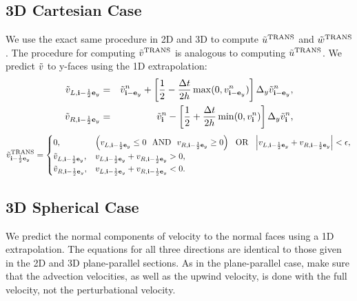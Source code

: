 \newpage

\subsection{3D Cartesian Case}
We use the exact same procedure in 2D and 3D to compute $\tilde{u}^{\rm TRANS}$ and 
$\tilde{w}^{\rm TRANS}$. The procedure for computing $\tilde{v}^{\rm TRANS}$ is analogous to
computing $\tilde{u}^{\rm TRANS}$.  We predict $\tilde{v}$ to y-faces using the
1D extrapolation:
\begin{eqnarray}
\tilde{v}_{L,{\bf i}-\frac{1}{2}{\bf e}_y} &=& \tilde{v}_{{\bf i}-{\bf e}_y}^n + \left[\frac{1}{2} - \frac{\Delta t}{2h}\max(0,v_{{\bf i}-{\bf e}_y}^n)\right]\Delta_y \tilde{v}_{{\bf i}-{\bf e}_y}^n, \\
\tilde{v}_{R,{\bf i}-\frac{1}{2}{\bf e}_y} &=& \tilde{v}_{{\bf i}}^n - \left[\frac{1}{2} + \frac{\Delta t}{2h}\min(0,v_{{\bf i}}^n)\right]\Delta_y \tilde{v}_{{\bf i}}^n,
\end{eqnarray}
\begin{equation}
\tilde{v}^{\rm TRANS}_{{\bf i}-\frac{1}{2}{\bf e}_y} =
\begin{cases}
0, & \left(v_{L,{\bf i}-\frac{1}{2}{\bf e}_y} \le 0 ~~ {\rm AND} ~~ v_{R,{\bf i}-\frac{1}{2}{\bf e}_y} \ge 0\right) ~~ {\rm OR} ~~ \left|v_{L,{\bf i}-\frac{1}{2}{\bf e}_y} + v_{R,{\bf i}-\frac{1}{2}{\bf e}_y}\right| < \epsilon, \\
\tilde{v}_{L,{\bf i}-\frac{1}{2}{\bf e}_y}, & v_{L,{\bf i}-\frac{1}{2}{\bf e}_y} + v_{R,{\bf i}-\frac{1}{2}{\bf e}_y} > 0, \\
\tilde{v}_{R,{\bf i}-\frac{1}{2}{\bf e}_y}, & v_{L,{\bf i}-\frac{1}{2}{\bf e}_y} + v_{R,{\bf i}-\frac{1}{2}{\bf e}_y} < 0. \\
\end{cases}
\end{equation}

\newpage

\subsection{3D Spherical Case}
We predict the normal components of velocity to the normal faces 
using a 1D extrapolation.  The equations for all three directions 
are identical to those given in the 2D and 3D plane-parallel 
sections.  As in the plane-parallel case, make sure
 that the advection velocities, as well as 
the upwind velocity, is done with the full velocity, not the 
perturbational velocity.

\newpage

